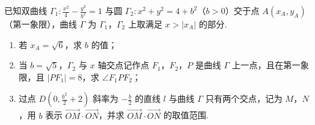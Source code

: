 \begin{problem}
已知双曲线 \(\Gamma_1:\frac{x^2}{4}-\frac{y^2}{b^2}=1\) 与圆 \(\Gamma_2:x^2+y^2=4+b^2\)（\(b>0\)）交于点 \(A(x_A,y_A)\)（第一象限），曲线 \(\Gamma\) 为 \(\Gamma_1\)，\(\Gamma_2\) 上取满足 \(x>|x_A|\) 的部分.

\begin{enumerate}
\item 若 \(x_A=\sqrt6\)，求 \(b\) 的值；
\item 当 \(b=\sqrt5\)，\(\Gamma_2\) 与 \(x\) 轴交点记作点 \(F_1\)，\(F_2\)，\(P\) 是曲线 \(\Gamma\) 上一点，且在第一象限，且 \(|PF_1|=8\)，求 \(\angle F_1PF_2\)；
\item 过点 \(D\left(0,\frac{b^2}{2}+2\right)\) 斜率为 \(-\frac{b}{2}\) 的直线 \(l\) 与曲线 \(\Gamma\) 只有两个交点，记为 \(M\)，\(N\)，用 \(b\) 表示 \(\overrightarrow{OM}\cdot\overrightarrow{ON}\)，并求 \(\overrightarrow{OM}\cdot\overrightarrow{ON}\) 的取值范围.
\end{enumerate}
\end{problem}

